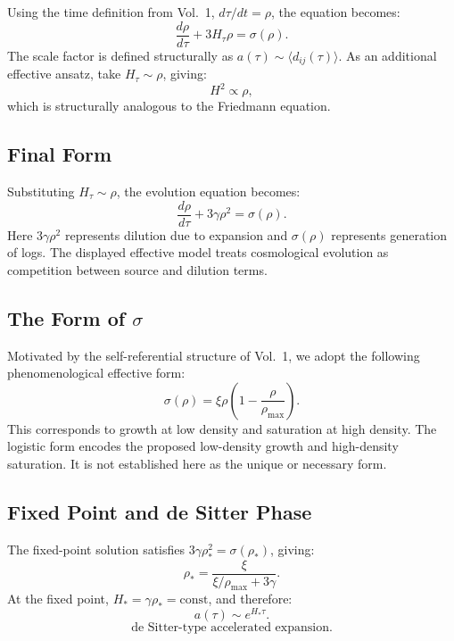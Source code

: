 Using the time definition from Vol.~1, $d\tau/dt = \rho$,
the equation becomes:
\begin{equation}
  \label{eq:tau_evolution}
  \boxed{\frac{d\rho}{d\tau} + 3H_\tau \rho = \sigma(\rho).}
\end{equation}
The scale factor is defined structurally as
$a(\tau) \sim \langle d_{ij}(\tau)\rangle$.
As an additional effective ansatz, take $H_\tau \sim \rho$, giving:
\begin{equation}
  H^2 \propto \rho,
\end{equation}
which is structurally analogous to the Friedmann equation.

\subsection{Final Form}

Substituting $H_\tau \sim \rho$, the evolution equation becomes:
\begin{equation}
  \label{eq:VED_cosmo}
  \boxed{\frac{d\rho}{d\tau} + 3\gamma \rho^2 = \sigma(\rho).}
\end{equation}
Here $3\gamma\rho^2$ represents dilution due to expansion
and $\sigma(\rho)$ represents generation of logs.
The displayed effective model treats cosmological evolution as competition
between source and dilution terms.

\subsection{The Form of $\sigma$}

Motivated by the self-referential structure of Vol.~1, we adopt the following
phenomenological effective form:
\begin{equation}
  \label{eq:sigma_form}
  \boxed{\sigma(\rho) = \xi \rho \left(1 - \frac{\rho}{\rho_{\max}}\right).}
\end{equation}
This corresponds to growth at low density and saturation at high density.
The logistic form encodes the proposed low-density growth and high-density
saturation. It is not established here as the unique or necessary form.

\subsection{Fixed Point and de Sitter Phase}

The fixed-point solution satisfies $3\gamma\rho_*^2 = \sigma(\rho_*)$, giving:
\begin{equation}
  \rho_* = \frac{\xi}{\xi/\rho_{\max} + 3\gamma}.
\end{equation}
At the fixed point, $H_* = \gamma\rho_* = \text{const}$, and therefore:
\begin{equation}
  \label{eq:deSitter}
  \boxed{a(\tau) \sim e^{H_*\tau}.}
\end{equation}
\begin{equation}
  \boxed{\text{de Sitter-type accelerated expansion.}}
\end{equation}

